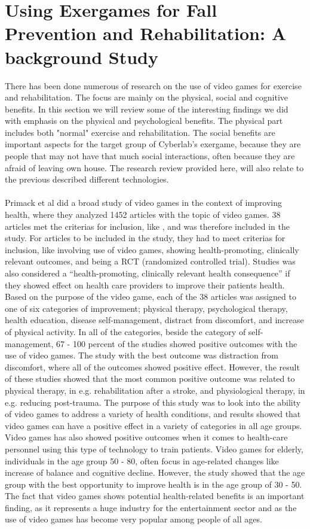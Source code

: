 \section{Using Exergames for Fall Prevention and Rehabilitation: A background Study}
There has been done numerous of research on the use of video games for exercise and rehabilitation. The focus are mainly on the physical, social and cognitive benefits. In this section we will review some of the interesting findings we did with emphasis on the physical and psychological benefits. The physical part includes both "normal" exercise and rehabilitation. The social benefits are important aspects for the target group of Cyberlab's exergame, because they are people that may not have that much social interactions, often because they are afraid of leaving own house. The research review provided here, will also relate to the previous described different technologies.\\ \\
Primack et al did a broad study of video games in the context of improving health, where they analyzed 1452 articles with the topic of video games. 38 articles met the criterias for inclusion, like , and was therefore included in the study. For articles to be included in the study, they had to meet criterias for inclusion, like involving use of video games, showing health-promoting, clinically relevant outcomes, and being a RCT (randomized controlled trial). Studies was also considered a “health-promoting, clinically relevant health consequence” if they showed effect on health care providers to improve their patients health. Based on the purpose of the video game, each of the 38 articles was assigned to one of six categories of improvement; physical therapy, psychological therapy, health education, disease self-management, distract from discomfort, and increase of physical activity. In all of the categories, beside the category of self-management, 67 - 100 percent of the studies showed positive outcomes with the use of video games. The study with the best outcome was distraction from discomfort, where all of the outcomes showed positive effect. However, the result of these studies showed that the most common positive outcome was related to physical therapy, in e.g. rehabilitation after a stroke, and physiological therapy, in e.g. reducing post-trauma. The purpose of this study was to look into the ability of video games to address a variety of health conditions, and results showed that video games can have a positive effect in a variety of categories in all age groups. Video games has also showed positive outcomes when it comes to health-care personnel using this type of technology to train patients. Video games for elderly, individuals in the age group 50 - 80, often focus in age-related changes like increase of balance and cognitive decline. However, the study showed that the age group with the best opportunity to improve health is in the age group of 30 - 50. The fact that video games shows potential health-related benefits is an important finding, as it represents a huge industry for the entertainment sector and as the use of video games has become very popular among people of all ages. \cite{roleofvideogames} \\ \\
